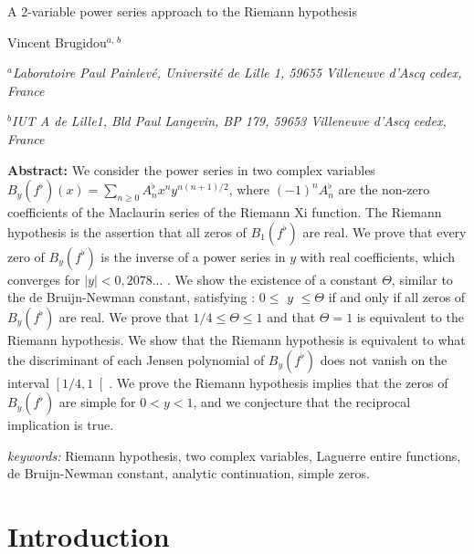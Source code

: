\documentclass{article}
\begin{document}
\begin{center}
{\huge A 2-variable power series approach to the Riemann hypothesis }

\bigskip

{\huge \bigskip}

{\large Vincent Brugidou}$^{a,\,b}$ 
\end{center}

\bigskip

\begin{center}
$^{a}$\textit{Laboratoire Paul Painlev\'{e}, Universit\'{e} de Lille 1,
59655 Villeneuve d'Ascq cedex, France}

$^{b}$\textit{IUT A de Lille1, Bld Paul Langevin, BP 179, 59653 Villeneuve
d'Ascq cedex, France}
\end{center}

\bigskip

\textbf{Abstract: }We consider the power series in two complex variables $B_{y}\left( f^{\flat }\right) \left( x\right) =\sum_{n\geq 0}A_{n}^{\flat
}x^{n}y^{n\left( n+1\right) /2}$, where $\left( -1\right) ^{n}A_{n}^{\flat }$
are the non-zero coefficients of the Maclaurin series of the Riemann Xi
function. The Riemann hypothesis is the assertion that all zeros of $B_{1}\left( f^{\flat }\right) $ are real. We prove that every zero of $B_{y}\left( f^{\flat }\right) $ is the inverse of a power series in $y$ with
real coefficients, which converges for $\left| y\right| <0,2078...$ . We
show the existence of a constant $\Theta $, similar to the de Bruijn-Newman
constant, satisfying : $0\leq $ $y$ $\leq \Theta $ if and only if all zeros
of $B_{y}\left( f^{\flat }\right) $ are real. We prove that $1/4\leq \Theta
\leq 1$ and that $\Theta =1$ is equivalent to the Riemann hypothesis. We
show that the Riemann hypothesis is equivalent to what the discriminant of
each Jensen polynomial of $B_{y}\left( f^{\flat }\right) $ does not vanish
on the interval $\left[ 1/4,1\right[ $. We prove the Riemann hypothesis
implies that the zeros of $B_{y}\left( f^{\flat }\right) $ are simple for $0<y<1$, and we conjecture that the reciprocal implication is true.

\textit{keywords: }Riemann hypothesis, two complex variables, Laguerre
entire functions, de Bruijn-Newman constant, analytic continuation, simple
zeros.

\section{\protect\bigskip \textbf{Introduction}}
\end{document}
